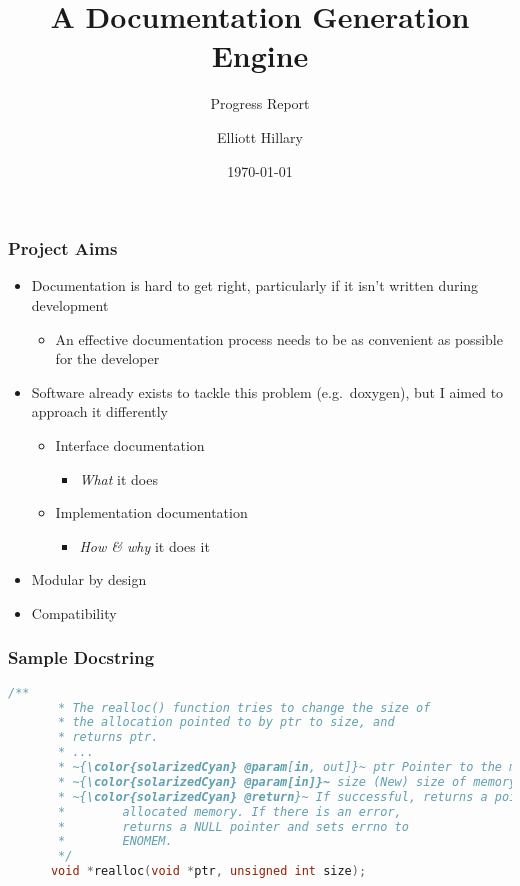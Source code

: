 \documentclass{beamer}
\title{A Documentation Generation Engine}
\subtitle{Progress Report}
\author{Elliott Hillary}
\date{\today}
\begin{document}
  \begin{frame}
    \titlepage
  \end{frame}
  \begin{frame}
    \frametitle{Project Aims}
      \begin{itemize}
        \item Documentation is hard to get right, particularly if it isn't
          written during development
          \begin{itemize}
            \item An effective documentation process needs to be as convenient
              as possible for the developer
          \end{itemize}
          \item Software already exists to tackle this problem (e.g.~doxygen),
            but I aimed to approach it differently
            \begin{itemize}
              \item Interface documentation
                \begin{itemize}
                  \item \emph{What} it does
                \end{itemize}
              \item Implementation documentation
                  \begin{itemize}
                    \item \emph{How \& why} it does it
                  \end{itemize}
            \end{itemize}
          \item Modular by design
          \item Compatibility
      \end{itemize}
  \end{frame}

  \begin{frame}[fragile]
    \frametitle{Sample Docstring}
    \begin{lstlisting}[language=c, gobble=5, escapechar=~]
      /**
       * The realloc() function tries to change the size of
       * the allocation pointed to by ptr to size, and
       * returns ptr.
       * ...
       * ~{\color{solarizedCyan} @param[in, out]}~ ptr Pointer to the memory.
       * ~{\color{solarizedCyan} @param[in]}~ size (New) size of memory desired.
       * ~{\color{solarizedCyan} @return}~ If successful, returns a pointer to
       *        allocated memory. If there is an error,
       *        returns a NULL pointer and sets errno to
       *        ENOMEM.
       */
      void *realloc(void *ptr, unsigned int size);
    \end{lstlisting}
\end{frame}
\end{document}
